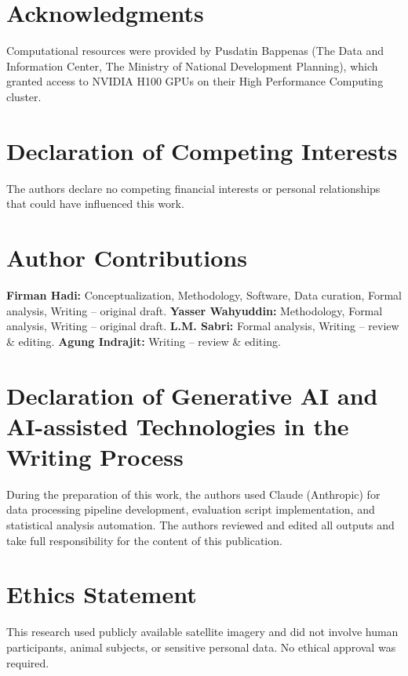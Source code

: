 \documentclass[12pt,a4paper]{article}
\begin{document}
\section*{Acknowledgments}

Computational resources were provided by Pusdatin Bappenas (The Data and Information Center, The Ministry of National Development Planning), which granted access to NVIDIA H100 GPUs on their High Performance Computing cluster.



\section*{Declaration of Competing Interests}

The authors declare no competing financial interests or personal relationships that could have influenced this work.



\section*{Author Contributions}

\textbf{Firman Hadi:} Conceptualization, Methodology, Software, Data curation, Formal analysis, Writing -- original draft. \textbf{Yasser Wahyuddin:} Methodology, Formal analysis, Writing -- original draft. \textbf{L.M. Sabri:} Formal analysis, Writing -- review \& editing. \textbf{Agung Indrajit:} Writing -- review \& editing.



\section*{Declaration of Generative AI and AI-assisted Technologies in the Writing Process}

During the preparation of this work, the authors used Claude (Anthropic) for data processing pipeline development, evaluation script implementation, and statistical analysis automation. The authors reviewed and edited all outputs and take full responsibility for the content of this publication.



\section*{Ethics Statement}

This research used publicly available satellite imagery and did not involve human participants, animal subjects, or sensitive personal data. No ethical approval was required.
\end{document}

